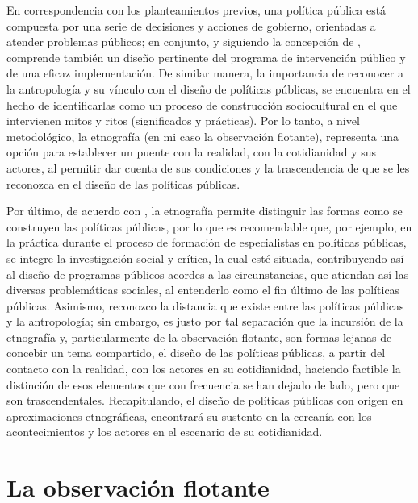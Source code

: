 \documentclass[
  spanish,
  11pt,
  a4paper,
]{scrbook}
\begin{document}
En correspondencia con los planteamientos previos, una política pública
está compuesta por una serie de decisiones y acciones de gobierno,
orientadas a atender problemas públicos; en conjunto, y siguiendo la
concepción de \textcite{Cejudo2016}, comprende también un diseño
pertinente del programa de intervención público y de una eficaz
implementación. De similar manera, la importancia de reconocer a la
antropología y su vínculo con el diseño de políticas públicas, se
encuentra en el hecho de identificarlas como un proceso de construcción
sociocultural en el que intervienen mitos y ritos (significados y
prácticas). Por lo tanto, a nivel metodológico, la etnografía (en mi
caso la observación flotante), representa una opción para establecer un
puente con la realidad, con la cotidianidad y sus actores, al permitir
dar cuenta de sus condiciones y la trascendencia de que se les reconozca
en el diseño de las políticas públicas.

Por último, de acuerdo con \textcite{Mendoza2021}, la etnografía permite
distinguir las formas como se construyen las políticas públicas, por lo
que es recomendable que, por ejemplo, en la práctica durante el proceso
de formación de especialistas en políticas públicas, se integre la
investigación social y crítica, la cual esté situada, contribuyendo así
al diseño de programas públicos acordes a las circunstancias, que
atiendan así las diversas problemáticas sociales, al entenderlo como el
fin último de las políticas públicas. Asimismo, reconozco la distancia
que existe entre las políticas públicas y la antropología; sin embargo,
es justo por tal separación que la incursión de la etnografía y,
particularmente de la observación flotante, son formas lejanas de
concebir un tema compartido, el diseño de las políticas públicas, a
partir del contacto con la realidad, con los actores en su cotidianidad,
haciendo factible la distinción de esos elementos que con frecuencia se
han dejado de lado, pero que son trascendentales. Recapitulando, el
diseño de políticas públicas con origen en aproximaciones etnográficas,
encontrará su sustento en la cercanía con los acontecimientos y los
actores en el escenario de su cotidianidad.

\section*{La observación flotante}\label{la-observaciuxf3n-flotante}

\end{document}
